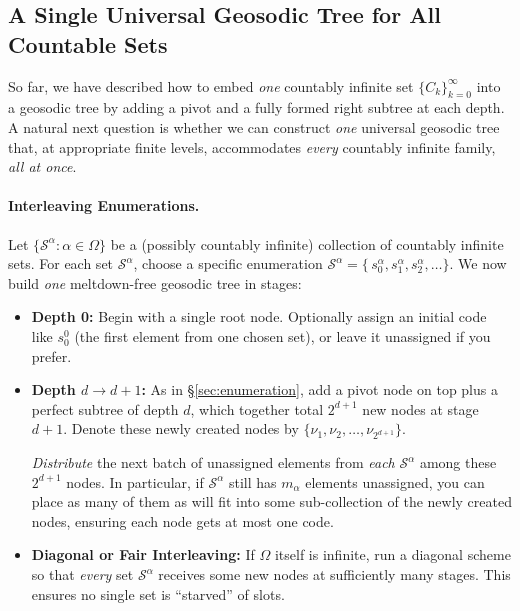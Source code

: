 \subsection{A Single Universal Geosodic Tree for All Countable Sets}
\label{sec:single-geosodic}

So far, we have described how to embed \emph{one} countably infinite set 
$\{C_k\}_{k=0}^\infty$ into a geosodic tree by adding a pivot and a fully formed 
right subtree at each depth. A natural next question is whether we can 
construct \emph{one} universal geosodic tree that, at appropriate finite levels, 
accommodates \emph{every} countably infinite family, \emph{all at once}.

\paragraph{Interleaving Enumerations.}
Let $\{\mathcal{S}^\alpha : \alpha \in \Omega\}$ be a (possibly countably infinite) 
collection of countably infinite sets. For each set $\mathcal{S}^\alpha$, 
choose a specific enumeration 
$\mathcal{S}^\alpha = \{\,s^\alpha_0, s^\alpha_1, s^\alpha_2, \dots \}$. 
We now build \emph{one} meltdown-free geosodic tree in stages:

\begin{itemize}
    \item \textbf{Depth 0:} 
    Begin with a single root node. Optionally assign an initial code like $s^0_0$ 
    (the first element from one chosen set), or leave it unassigned if you prefer.

    \item \textbf{Depth $d \to d+1$:} 
    As in \S\ref{sec:enumeration}, add a pivot node on top plus a perfect subtree of depth $d$, 
    which together total $2^{d+1}$ new nodes at stage $d+1$. 
    Denote these newly created nodes by $\{\nu_1, \nu_2, \dots, \nu_{2^{d+1}}\}$.

    \emph{Distribute} the next batch of unassigned elements from \emph{each} $\mathcal{S}^\alpha$ 
    among these $2^{d+1}$ nodes. In particular, if $\mathcal{S}^\alpha$ still has 
    $m_\alpha$ elements unassigned, you can place as many of them as will fit 
    into some sub-collection of the newly created nodes, ensuring each node gets at most one code. 

    \item \textbf{Diagonal or Fair Interleaving:} 
    If $\Omega$ itself is infinite, run a diagonal scheme so that \emph{every} set $\mathcal{S}^\alpha$ 
    receives some new nodes at sufficiently many stages. This ensures no single set 
    is “starved” of slots. 
\end{itemize}


